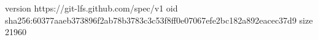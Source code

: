 version https://git-lfs.github.com/spec/v1
oid sha256:60377aaeb373896f2ab78b3783c3c53f8ff0e07067efe2bc182a892eacec37d9
size 21960
